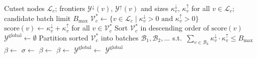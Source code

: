 \documentclass[letterpaper]{article}
\begin{document}
\begin{algorithm}[tbp!]
\caption{GPU Subroutine: Cutset Coupling}
\label{alg:gpu_cutset_coupling}
\begin{algorithmic}[1]
\Require Cutset nodes $\mathcal{L}_c$; frontiers $\mathcal{Y}^{\downarrow}(v)$, $\mathcal{Y}^{\uparrow}(v)$ and sizes $\kappa^{\downarrow}_v$, $\kappa^{\uparrow}_v$ for all $v \in \mathcal{L}_c$; candidate batch limit $B_{\max}$
\State $\mathcal{V}^*_c \gets \{v \in \mathcal{L}_c \mid \kappa^{\downarrow}_v > 0 \text{ and } \kappa^{\uparrow}_v > 0\}$ 
\State $\text{score}(v) \gets \kappa^{\downarrow}_v + \kappa^{\uparrow}_v$ for all $v \in \mathcal{V}^*_c$
\State Sort $\mathcal{V}^*_c$ in descending order of $\text{score}(v)$
\State $\mathcal{Y}^{\text{global}} \gets \emptyset$ 
\State Partition sorted $\mathcal{V}^*_c$ into batches $\mathcal{B}_1, \mathcal{B}_2, \dots$ s.t.\ $\sum_{v \in \mathcal{B}_k} \kappa^{\downarrow}_v \cdot \kappa^{\uparrow}_v \le B_{\max}$
    \State $\beta \gets$ 
        \State $\sigma \gets$ 
        \State $\beta \gets$ 
    \EndIf
    \State $\beta \gets$  
    \State $\mathcal{Y}^{\text{global}} \gets$  
\EndFor
\State \Return $\mathcal{Y}^{\text{global}}$
\end{algorithmic}
\end{algorithm}
\end{document}

